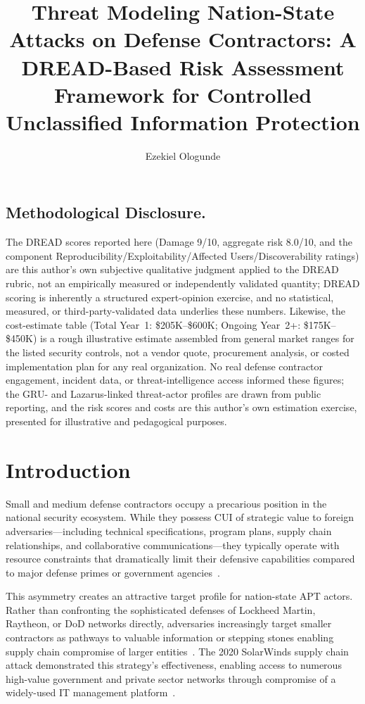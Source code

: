 \documentclass[sigconf,nonacm]{acmart}
\title{Threat Modeling Nation-State Attacks on Defense Contractors:
A DREAD-Based Risk Assessment Framework for Controlled Unclassified Information Protection}
\author{Ezekiel Ologunde}
\affiliation{\institution{Independent Researcher}\city{Boston}\state{MA}\country{USA}}
\begin{document}
\maketitle

\subsection*{Methodological Disclosure.}
The DREAD scores reported here (Damage 9/10, aggregate risk 8.0/10, and the
component Reproducibility/Exploitability/Affected Users/Discoverability
ratings) are this author's own subjective qualitative judgment applied to
the DREAD rubric, not an empirically measured or independently validated
quantity; DREAD scoring is inherently a structured expert-opinion exercise,
and no statistical, measured, or third-party-validated data underlies these
numbers. Likewise, the cost-estimate table (Total Year~1: \$205K--\$600K;
Ongoing Year~2+: \$175K--\$450K) is a rough illustrative estimate assembled
from general market ranges for the listed security controls, not a vendor
quote, procurement analysis, or costed implementation plan for any real
organization. No real defense contractor engagement, incident data, or
threat-intelligence access informed these figures; the GRU- and
Lazarus-linked threat-actor profiles are drawn from public reporting, and
the risk scores and costs are this author's own estimation exercise,
presented for illustrative and pedagogical purposes.

\section{Introduction}

Small and medium defense contractors occupy a precarious position in the national
security ecosystem. While they possess CUI of strategic value to foreign
adversaries---including technical specifications, program plans, supply chain
relationships, and collaborative communications---they typically operate with resource
constraints that dramatically limit their defensive capabilities compared to major
defense primes or government agencies~\cite{gao2021defense}.

This asymmetry creates an attractive target profile for nation-state APT actors.
Rather than confronting the sophisticated defenses of Lockheed Martin, Raytheon, or DoD
networks directly, adversaries increasingly target smaller contractors as pathways to
valuable information or stepping stones enabling supply chain compromise of larger
entities~\cite{crowdstrike2024global}. The 2020 SolarWinds supply chain attack
demonstrated this strategy's effectiveness, enabling access to numerous high-value
government and private sector networks through compromise of a widely-used IT management
platform~\cite{smith2021solarwinds}.
\end{document}
